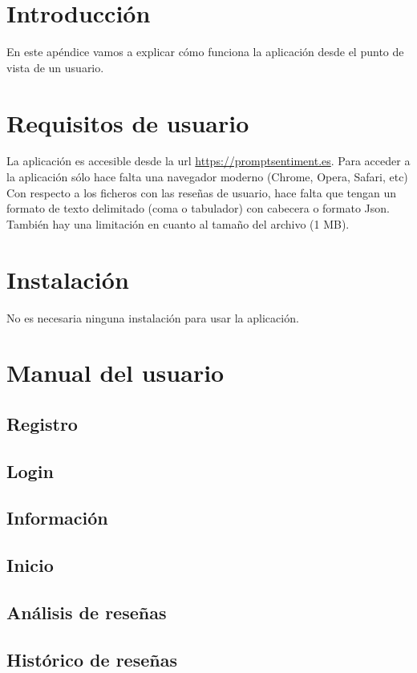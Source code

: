 
\section{Introducción}
En este apéndice vamos a explicar cómo funciona la aplicación desde el punto de vista de un usuario.

\section{Requisitos de usuario}
La aplicación es accesible desde la url \href{https://promptsentiment.es}{https://promptsentiment.es}.
Para acceder a la aplicación sólo hace falta una navegador moderno (Chrome, Opera, Safari, etc)
Con respecto a los ficheros con las reseñas de usuario, hace falta que tengan un formato 
de texto delimitado (coma o tabulador) con cabecera o formato Json.
También hay una limitación en cuanto al tamaño del archivo (1 MB).


\section{Instalación}
No es necesaria ninguna instalación para usar la aplicación.

\section{Manual del usuario}

\subsection{Registro}
\subsection{Login}
\subsection{Información}
\subsection{Inicio}
\subsection{Análisis de reseñas}
\subsection{Histórico de reseñas}


